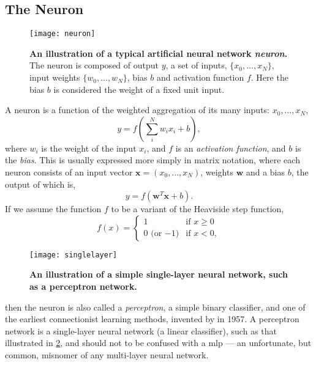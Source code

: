 \documentclass[thesis]{subfiles}
\begin{document}
\subsection{The Neuron}

\begin{figure}[tbp]
\centering
\texttt{[image: neuron]}
\caption[An illustration of a typical artificial neural network neuron]{\textbf{An illustration of a typical artificial neural network \emph{neuron}.} The neuron is composed of output $y$, a set of inputs, $\{x_0, \ldots, x_N\}$, input weights $\{w_0, \ldots, w_N\}$, bias $b$ and activation function $f$. Here the bias $b$ is considered the weight of a fixed unit input.}
\label{fig:neuron}
\end{figure}
A neuron is a function of the weighted aggregation of its many inputs: ${x_0,\ldots,x_N}$,
%
\begin{equation}
	y = f\left(\sum_{i}^{N} w_i x_i + b\right),
\end{equation}
%
where $w_i$ is the weight of the input $x_i$, and $f$ is an \emph{activation function}, and $b$ is the \emph{bias}. This is usually expressed more simply in matrix notation, where each neuron consists of an input vector $\mathbf{x}=(x_0,\ldots,x_N)$, weights $\mathbf{w}$ and a bias $b$, the output of which is, %
%
\begin{equation}
    y = f\left(\mathbf{w}^T\mathbf{x} + b \right).
\end{equation}
%
If we assume the function $f$ to be a variant of the Heaviside step function,
\begin{equation}
    f(x) = 
\begin{cases}
1 & \text{if } x \geq 0\\
0 \textrm{ (or $-1$)} & \text{if } x < 0,
\end{cases}
\end{equation}
%
\begin{figure}[tbp]
\centering
\texttt{[image: singlelayer]}
\caption[A single-layer neural network]{\textbf{An illustration of a simple single-layer neural network, such as a perceptron network.}}
\label{fig:singlelayer}
\end{figure}
then the neuron is also called a \emph{perceptron}, a simple binary classifier, and one of the earliest connectionist learning methods, invented by \citet{rosenblatt1958perceptron} in 1957. A perceptron network is a single-layer neural network (\ie a linear classifier), such as that illustrated in \cref{fig:singlelayer}, and should not to be confused with a \gls{mlp} --- an unfortunate, but common, misnomer of any multi-layer neural network.
\end{document}

